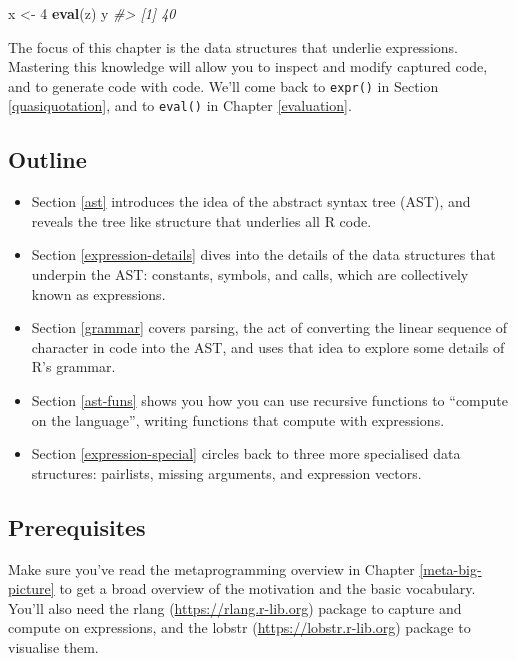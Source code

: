 \documentclass[]{book}
\newenvironment{Shaded}{\begin{snugshade}}{\end{snugshade}}
\newcommand{\CommentTok}[1]{\textcolor[rgb]{0.37,0.37,0.37}{\textit{#1}}}
\newcommand{\DecValTok}[1]{\textcolor[rgb]{0.06,0.06,0.06}{#1}}
\newcommand{\KeywordTok}[1]{\textcolor[rgb]{0.27,0.27,0.27}{\textbf{#1}}}
\newcommand{\NormalTok}[1]{#1}
\newcommand{\StringTok}[1]{\textcolor[rgb]{0.5,0.5,0.5}{#1}}
\renewcommand{\href}[2]{#2 (\url{#1})}
\begin{document}
\begin{Shaded}
\begin{Highlighting}[]
\NormalTok{x <-}\StringTok{ }\DecValTok{4}
\KeywordTok{eval}\NormalTok{(z)}
\NormalTok{y}
\CommentTok{#> [1] 40}
\end{Highlighting}
\end{Shaded}

The focus of this chapter is the data structures that underlie expressions. Mastering this knowledge will allow you to inspect and modify captured code, and to generate code with code. We'll come back to \texttt{expr()} in Section \ref{quasiquotation}, and to \texttt{eval()} in Chapter \ref{evaluation}.

\hypertarget{outline-1}{%
\subsection*{Outline}\label{outline-1}}

\begin{itemize}
\item
  Section \ref{ast} introduces the idea of the abstract syntax tree (AST),
  and reveals the tree like structure that underlies all R code.
\item
  Section \ref{expression-details} dives into the details of the data
  structures that underpin the AST: constants, symbols, and calls, which
  are collectively known as expressions.
\item
  Section \ref{grammar} covers parsing, the act of converting the linear
  sequence of character in code into the AST, and uses that idea to explore
  some details of R's grammar.
\item
  Section \ref{ast-funs} shows you how you can use recursive functions to
  ``compute on the language'', writing functions that compute with expressions.
\item
  Section \ref{expression-special} circles back to three more
  specialised data structures: pairlists, missing arguments, and expression
  vectors.
\end{itemize}

\hypertarget{prerequisites-1}{%
\subsection*{Prerequisites}\label{prerequisites-1}}

Make sure you've read the metaprogramming overview in Chapter \ref{meta-big-picture} to get a broad overview of the motivation and the basic vocabulary. You'll also need the \href{https://rlang.r-lib.org}{rlang} package to capture and compute on expressions, and the \href{https://lobstr.r-lib.org}{lobstr} package to visualise them.
\end{document}

